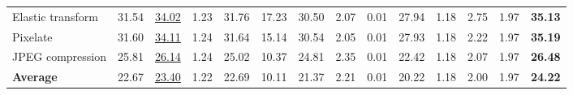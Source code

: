 \begin{table}[t]
{\begin{tabular}{lrrrrrrrrrrrrr}
Elastic transform & 31.54 & \underline{34.02} & 1.23 & 31.76 & 17.23 & 30.50 & 2.07 & 0.01 & 27.94 & 1.18 & 2.75 & 1.97 & \textbf{35.13} \\
Pixelate & 31.60 & \underline{34.11} & 1.24 & 31.64 & 15.14 & 30.54 & 2.05 & 0.01 & 27.93 & 1.18 & 2.22 & 1.97 & \textbf{35.19} \\
JPEG compression & 25.81 & \underline{26.14} & 1.24 & 25.02 & 10.37 & 24.81 & 2.35 & 0.01 & 22.42 & 1.18 & 2.07 & 1.97 & \textbf{26.48} \\
\midrule
\textbf{Average} & 22.67 & \underline{23.40} & 1.22 & 22.69 & 10.11 & 21.37 & 2.21 & 0.01 & 20.22 & 1.18 & 2.00 & 1.97 & \textbf{24.22} \\
\bottomrule
\end{tabular}%
}
\end{table}

